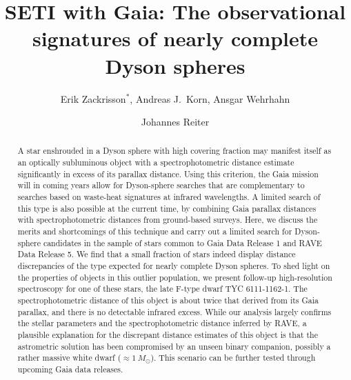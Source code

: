 \documentclass[twocolumn]{aastex6}
\begin{document}

\title{SETI with Gaia: The observational signatures of nearly complete Dyson spheres}


\author{Erik Zackrisson$^*$, Andreas J.\ Korn, Ansgar Wehrhahn}
\author{Johannes Reiter}

\begin{abstract}
A star enshrouded in a Dyson sphere with high covering fraction may manifest itself as an optically subluminous object with a spectrophotometric distance estimate significantly in excess of its parallax distance. Using this criterion, the Gaia mission will in coming years allow for Dyson-sphere searches that are complementary to searches based on waste-heat signatures at infrared wavelengths. A limited search of this type is also possible at the current time, by combining Gaia parallax distances with spectrophotometric distances from ground-based surveys. Here, we discuss the merits and shortcomings of this technique and carry out a limited search for Dyson-sphere candidates in the sample of stars common to Gaia Data Release 1 and RAVE Data Release 5. We find that a small fraction of stars indeed display distance discrepancies of the type expected for nearly complete Dyson spheres. To shed light on the properties of objects in this outlier population, we present follow-up high-resolution spectroscopy for one of these stars, the late F-type dwarf TYC 6111-1162-1. The spectrophotometric distance of this object is about twice that derived from its Gaia parallax, and there is no detectable infrared excess. While our analysis largely confirms the stellar parameters and the spectrophotometric distance inferred by RAVE, a plausible explanation for the discrepant distance estimates of this object is that the astrometric solution has been compromised by an unseen binary companion, possibly a rather massive white dwarf ($\approx 1\ M_\odot$). This scenario can be further tested through upcoming Gaia data releases.   
\end{abstract}
\end{document}
